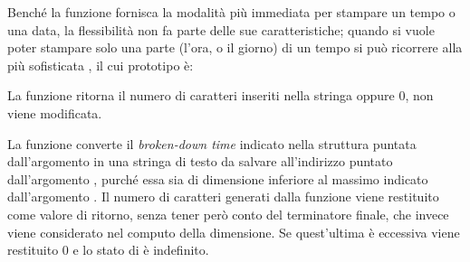 Benché la funzione  fornisca la modalità più immediata per
stampare un tempo o una data, la flessibilità non fa parte delle sue
caratteristiche; quando si vuole poter stampare solo una parte (l'ora, o il
giorno) di un tempo si può ricorrere alla più sofisticata ,
il cui prototipo è:

\begin{funcproto}{
}

{La funzione ritorna il numero di caratteri inseriti nella stringa 
  oppure $0$,  non viene modificata.}  
\end{funcproto}


La funzione converte il \textit{broken-down time} indicato nella struttura
puntata dall'argomento  in una stringa di testo da salvare
all'indirizzo puntato dall'argomento , purché essa sia di dimensione
inferiore al massimo indicato dall'argomento . Il numero di
caratteri generati dalla funzione viene restituito come valore di ritorno,
senza tener però conto del terminatore finale, che invece viene considerato
nel computo della dimensione. Se quest'ultima è eccessiva viene restituito 0 e
lo stato di  è indefinito.

